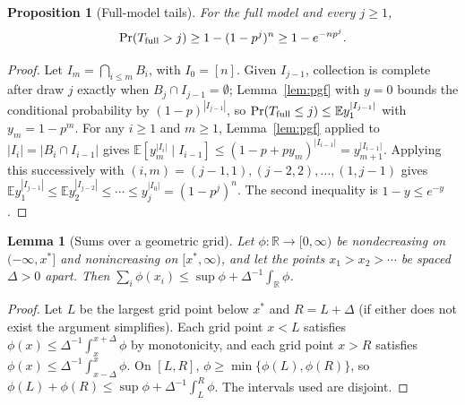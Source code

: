 \documentclass[11pt,a4paper]{article}
\newtheorem{lemma}[theorem]{Lemma}
\newtheorem{proposition}[theorem]{Proposition}
\theoremstyle{remark}
\newcommand{\E}{\mathbb E}
\begin{document}
\begin{proposition}[Full-model tails]\label{prop:fulltail}
For the full model and every $j\ge1$,
\[
 \Pr(T_{\rm full}>j)\ge1-(1-p^j)^n\ge1-e^{-np^j}.
\]
\end{proposition}
\begin{proof}
Let $I_m=\bigcap_{i\le m}B_i$, with $I_0=[n]$. Given $I_{j-1}$, collection is complete after draw $j$ exactly when $B_j\cap I_{j-1}=\emptyset$; Lemma~\ref{lem:pgf} with $y=0$ bounds the conditional probability by $(1-p)^{|I_{j-1}|}$, so $\Pr(T_{\rm full}\le j)\le\E y_1^{|I_{j-1}|}$ with $y_m=1-p^m$. For any $i\ge1$ and $m\ge1$, Lemma~\ref{lem:pgf} applied to $|I_i|=|B_i\cap I_{i-1}|$ gives $\E[y_m^{|I_i|}\mid I_{i-1}]\le(1-p+py_m)^{|I_{i-1}|}=y_{m+1}^{|I_{i-1}|}$. Applying this successively with $(i,m)=(j-1,1),(j-2,2),\dots,(1,j-1)$ gives $\E y_1^{|I_{j-1}|}\le\E y_2^{|I_{j-2}|}\le\cdots\le y_j^{|I_0|}=(1-p^j)^n$. The second inequality is $1-y\le e^{-y}$.
\end{proof}

\begin{lemma}[Sums over a geometric grid]\label{lem:grid}
Let $\phi:\mathbb R\to[0,\infty)$ be nondecreasing on $(-\infty,x^*]$ and nonincreasing on $[x^*,\infty)$, and let the points $x_1>x_2>\cdots$ be spaced $\Delta>0$ apart. Then $\sum_i\phi(x_i)\le\sup\phi+\Delta^{-1}\int_{\mathbb R}\phi$.
\end{lemma}
\begin{proof}
Let $L$ be the largest grid point below $x^*$ and $R=L+\Delta$ (if either does not exist the argument simplifies). Each grid point $x<L$ satisfies $\phi(x)\le\Delta^{-1}\int_x^{x+\Delta}\phi$ by monotonicity, and each grid point $x>R$ satisfies $\phi(x)\le\Delta^{-1}\int_{x-\Delta}^{x}\phi$. On $[L,R]$, $\phi\ge\min\{\phi(L),\phi(R)\}$, so $\phi(L)+\phi(R)\le\sup\phi+\Delta^{-1}\int_L^R\phi$. The intervals used are disjoint.
\end{proof}
\end{document}
